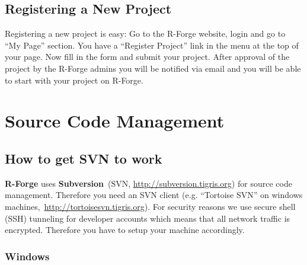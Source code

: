 \documentclass[a4paper]{article}
\begin{document}
\subsection{Registering a New Project}
\label{sec:newproject}

Registering a new project is easy: Go to the R-Forge website, login and
go to ``My Page'' section. You have a ``Register Project'' link in the
menu at the top of your page. Now fill in the form and submit your
project. After approval of the project by the R-Forge admins  you will
be notified via email and you will be able to start with your project
on R-Forge.

\section{Source Code Management}
\label{sec:scm}

\subsection{How to get SVN to work}
\label{sec:scmhowto}

\textbf{R-Forge} uses
\textbf{Subversion}~(SVN, \url{http://subversion.tigris.org}) for
source code management.
Therefore you need an SVN client (e.g. ``Tortoise SVN'' on
windows machines,~\url{http://tortoisesvn.tigris.org}). For security
reasons we use secure shell (SSH) tunneling for
developer accounts which means that all network traffic is
encrypted. Therefore you have to setup your machine accordingly.

\subsubsection{Windows}
\end{document}

